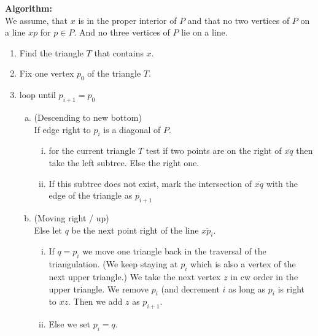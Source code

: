 \documentclass[11pt,a4paper,ngerman]{article}
\begin{document}
\textbf{Algorithm:}\\

We assume, that $x$ is in the proper interior of $P$ and that no two vertices
of $P$ on a line $xp$ for $p \in P$. And no three vertices of $P$ lie on a line.

\begin{enumerate}[1.]
    \item Find the triangle $T$ that contains $x$.
    \item Fix one vertex $p_0$ of the triangle $T$.
    \item loop until $p_{i+1} = p_0$
        \begin{enumerate}[a.]
                \item (Descending to new bottom)\\
                    If edge right to $p_i$ is a diagonal of $P$.
                \begin{enumerate}[(i)]
                    \item for the current triangle $T$ test if
                        two points are on the right of $\overline{xq}$
                        then take the left subtree. Else the right one.
                    \item If this subtree does not exist, mark the intersection
                        of $\overline{xq}$ with the edge of the triangle as
                        $p_{i+1}$
                \end{enumerate}
                \item (Moving right / up)\\
                    Else let $q$ be the next point right of the line 
                    $\overline{xp_i}$.
                    \begin{enumerate}[(i)]
                        \item If $q = p_i$ we move one triangle back in the
                            traversal of the triangulation. (We keep staying at
                            $p_i$ which is also a vertex of the next upper
                            triangle.)
                            We take the next vertex $z$ in cw order in
                            the upper triangle.
                            We remove $p_i$ (and decrement $i$ as long
                            as $p_i$ is right to $\overline{xz}$.
                            Then we add $z$ as $p_{i+1}$.
                        \item Else we set $p_i = q$.
                    \end{enumerate} 
        \end{enumerate}
\end{enumerate}
\end{document}

